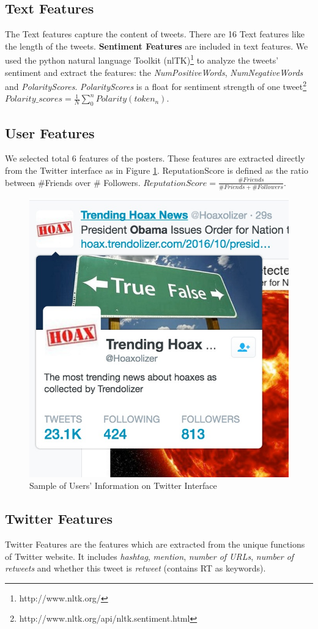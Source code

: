 \subsection{Text Features}
The Text features capture the content of tweets. There are 16 Text features like the length of the tweets. 
\textbf{Sentiment Features} are included in text features.
We used the python natural language Toolkit (nlTK)\footnote{http://www.nltk.org/} to analyze the tweets' sentiment and extract the features: the \emph{NumPositiveWords}, \emph{NumNegativeWords} and \emph{PolarityScores}. \emph{PolarityScores} is a float for sentiment strength of one tweet\footnote{http://www.nltk.org/api/nltk.sentiment.html} $Polarity\_scores = \frac {1}{N}    \sum_{0}^{n} {Polarity(token_n)}$.

\subsection{User Features} We selected total 6 features of the posters. These features are extracted directly from the Twitter interface as in Figure \ref{fig:UserSample}. ReputationScore is defined as the ratio between \#Friends over \# Followers. $ReputationScore = \frac {\#Friends }{\#Friends +\#Followers}$.
\begin{figure}[!h]
\centering
\includegraphics[width=0.45\columnwidth]{images/UserSample.png}
\caption{Sample of Users' Information on Twitter Interface}
\label{fig:UserSample}
\end{figure}
\newpage
\subsection{Twitter Features} Twitter Features are the features which are extracted from the unique functions of Twitter website. It includes \emph{hashtag}, \emph{mention}, \emph{number of URLs}, \emph{number of retweets} and whether this tweet is \emph{retweet} (contains RT as keywords).


